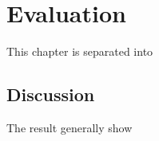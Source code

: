 \chapter{Evaluation}
\label{c:evaluation}

This chapter is separated into 


\section{Discussion}
\label{sec:discussion}
The result generally show